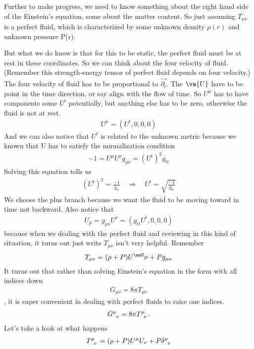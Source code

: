 \documentclass[10pt]{article}
\begin{document}
Further to make progress, we need to know something about the right hand side of the Einstein’s equation, some about the matter content. So just assuming $T_{\mu\nu}$ is a perfect fluid, which is characterized by some unknown density $\rho(r)$ and unknown pressure P(r).

But what we do know is that for this to be static, the perfect fluid must be at rest in these coordinates. So we can think about the four velocity of fluid. (Remember this strength-energy tensor of perfect fluid depends on four velocity.) The four velocity of fluid has to be proportional to $\vec{\partial_t}$. The $\va{U}$ have to be point in the time direction, or say align with the flow of time. So $U^\mu$ has to have components some $U^t$ potentially, but anything else has to be zero, otherwise the fluid is not at rest.
\begin{align}\label{GenMet2}U^\mu=(U^t,0,0,0)\end{align}
And we can also notice that $U^t$ is related to the unknown metric because we known that U has to satisfy the normalization condition
\begin{align}-1=U^\mu U^\nu g_{\mu\nu}=(U^t)^2g_{tt}\end{align}
Solving this equation tells us
\begin{align}(U^t)^2=\frac{-1}{g_{tt}} \quad\Rightarrow\quad U^t=\sqrt{\frac{-1}{g_{tt}}}\end{align}
We choose the plus branch because we want the fluid to be moving toward in time not backward.
Also notice that\begin{align} U_\mu=g_{\mu\nu}U^\nu=(g_{tt}U^t,0,0,0)\end{align}
because when we dealing with the perfect fluid and reviewing in this kind of situation, it turns out just write $T_{\mu\nu}$ isn’t very helpful. Remember \begin{align}T_{\mu\nu}=(\rho+P)U^\muU\nu+Pg_{\mu\nu}\end{align} It turns out that rather than solving Einstein’s equation in the form with all indices down \begin{align}G_{\mu\nu}=8\pi T_{\mu\nu}\end{align}, it is super convenient in dealing with perfect fluids to raise one indices. \begin{align}\tensor{G}{^\mu_\nu}=8\pi \tensor{T}{^\mu_\nu}.\end{align}
Let’s take a look at what happens
\begin{align}\tensor{T}{^\mu_\nu}=(\rho+P)U^\mu U_\nu+ P \tensor{\delta}{^\mu_\nu} \end{align}
\end{document}
